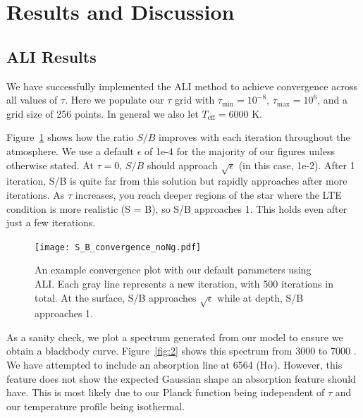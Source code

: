 \documentclass[12pt]{article}
\begin{document}
\section{Results and Discussion}
\label{sec:results}
\subsection{ALI Results}

We have successfully implemented the ALI method to achieve convergence across all values of $\tau$. Here we populate our $\tau$ grid with $\tau_\text{min} = 10^{-8}$, $\tau_\text{max} = 10^6$, and a grid size of 256 points. In general we also let $T_\text{eff} = 6000$ K.

Figure~\ref{fig:1} shows how the ratio $S / B$ improves with each iteration throughout the atmosphere. We use a default $\epsilon$ of 1e-4 for the majority of our figures unless otherwise stated. At $\tau = 0$, $S / B$ should approach $\sqrt\epsilon$ (in this case, 1e-2). After 1 iteration, S/B is quite far from this solution but rapidly approaches after more iterations. As $\tau$ increases, you reach deeper regions of the star where the LTE condition is more realistic (S = B), so S/B approaches 1. This holds even after just a few iterations. 

\begin{figure}[ht]
 \centering
 \texttt{[image: S\_B\_convergence\_noNg.pdf]}
 \caption{An example convergence plot with our default parameters using ALI. Each gray line represents a new iteration, with 500 iterations in total. At the surface, S/B approaches $\sqrt\epsilon$ while at depth, S/B approaches 1.}
 \label{fig:1}
\end{figure}

As a sanity check, we plot a spectrum generated from our model to ensure we obtain a blackbody curve. Figure~\ref{fig:2} shows this spectrum from 3000 to 7000 \text{\AA}. We have attempted to include an absorption line at 6564 \text{\AA } (H$\alpha$). However, this feature does not show the expected Gaussian shape an absorption feature should have. This is most likely due to our Planck function being independent of $\tau$ and our temperature profile being isothermal.
\end{document}
